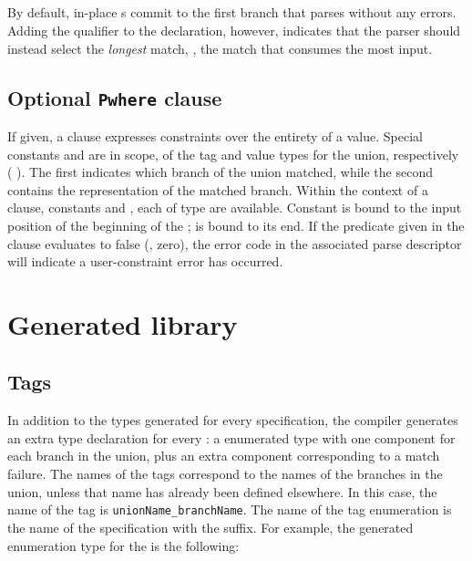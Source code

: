 \subsection{\Plongest{}}
By default, in-place \Punion{}s commit to the first branch that parses
without any errors. Adding the \Plongest{} qualifier to the
\Punion{} declaration, however, indicates that the parser should
instead select the \textit{longest} match, \ie{}, the match that
consumes the most input. 

\subsection{Optional \texttt{Pwhere} clause}
If given, a \Pwhere{} clause expresses constraints over the entirety
of a \Punion{} value.  Special constants  and  are
in scope, of the tag and value types for the union, respectively
(\cf{} ).  The
first indicates which branch of the union matched, while the second
contains the representation of the matched branch. 
Within the context of a 
\Pparsecheck{} clause, constants  and , each of type 
\Ppost{} are available.  Constant  is bound to the input
position of the beginning of the \punion{};  is bound to its end.
If the predicate given in
the \Pwhere{} clause evaluates to false (\ie{}, zero), the error code
in the associated parse descriptor will indicate a user-constraint
error has occurred.  

\section{Generated library}
\subsection{Tags}
\label{sec:unions-tags}
In addition to the types generated for every \pads{} specification,
the \pads{} compiler generates an extra type 
declaration for every \Punion{}: a enumerated type with one component
for each branch in the union, plus an extra component corresponding to
a match failure.  The names of the tags correspond to the names of the
branches in the union, unless that name
has already been defined 
elsewhere.  In this case, the name of the tag is 
\texttt{unionName\_branchName}.  
The name of the tag enumeration is the name of
the \pads{} specification with the  suffix.
For example, the generated enumeration type
for the \Punion{}  is the following:

